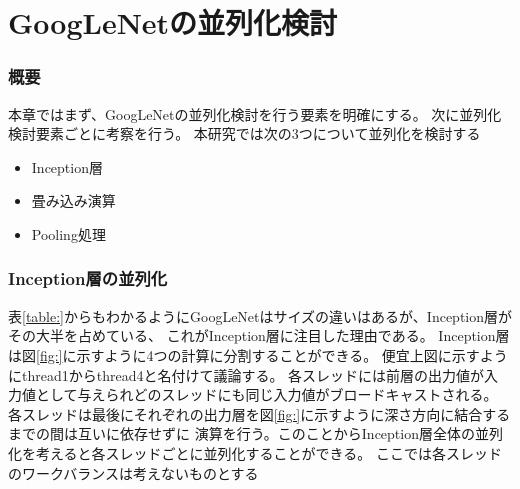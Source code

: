 \chapter{GoogLeNetの並列化検討}
{
\label{chap:parallel}

\subsection{概要}
本章ではまず、GoogLeNetの並列化検討を行う要素を明確にする。
次に並列化検討要素ごとに考察を行う。
本研究では次の3つについて並列化を検討する
\begin{itemize}
   \item Inception層 
   \item 畳み込み演算 
   \item Pooling処理 
\end{itemize}
\subsection{Inception層の並列化}
\label{sec:inception_para}
表\ref{table:}からもわかるようにGoogLeNetはサイズの違いはあるが、Inception層がその大半を占めている、
これがInception層に注目した理由である。
Inception層は図\ref{fig:}に示すように4つの計算に分割することができる。
便宜上図に示すようにthread1からthread4と名付けて議論する。
各スレッドには前層の出力値が入力値として与えられどのスレッドにも同じ入力値がブロードキャストされる。
各スレッドは最後にそれぞれの出力層を図\ref{fig:}に示すように深さ方向に結合するまでの間は互いに依存せずに
演算を行う。このことからInception層全体の並列化を考えると各スレッドごとに並列化することができる。
ここでは各スレッドのワークバランスは考えないものとする

}
